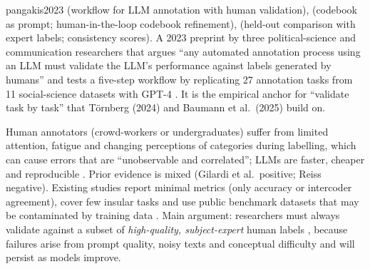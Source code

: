 \begin{papercard}{pangakis2023}
  (workflow for LLM annotation with human validation),  (codebook as prompt; human-in-the-loop codebook refinement),  (held-out comparison with expert labels; consistency scores). A 2023 preprint by three political-science and communication researchers that argues ``any automated annotation process using an LLM must validate the LLM's performance against labels generated by humans'' and tests a five-step workflow by replicating 27 annotation tasks from 11 social-science datasets with GPT-4 . It is the empirical anchor for ``validate task by task'' that Törnberg (2024) and Baumann et al.\ (2025) build on.

 Human annotators (crowd-workers or undergraduates) suffer from limited attention, fatigue and changing perceptions of categories during labelling, which can cause errors that are ``unobservable and correlated''; LLMs are faster, cheaper and reproducible . Prior evidence is mixed (Gilardi et al.\ positive; Reiss negative). Existing studies report minimal metrics (only accuracy or intercoder agreement), cover few insular tasks and use public benchmark datasets that may be contaminated by training data . Main argument: researchers must always validate against a subset of \emph{high-quality, subject-expert} human labels , because failures arise from prompt quality, noisy texts and conceptual difficulty and will persist as models improve.


\end{papercard}
